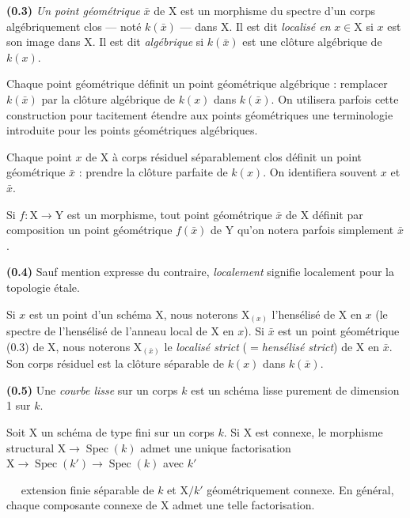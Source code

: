 \documentclass[11pt,leqno]{article}
\newcommand{\Page}[1]{\ifvmode\noindent\else\unskip\ \fi{\footnotesize\textcolor{gray}{[p.\,#1]}}\ \ignorespaces}
\begin{document}
\textbf{(0.3)} \textit{Un point géométrique} \(\bar{x}\) de \(\mathrm{X}\) est un morphisme du spectre d’un corps algébriquement clos — noté \(k(\bar{x})\) — dans \(\mathrm{X}\). Il est dit \textit{localisé en} \(x\in\mathrm{X}\) si \(x\) est son image dans \(\mathrm{X}\). Il est dit \textit{algébrique} si \(k(\bar{x})\) est une clôture algébrique de \(k(x)\).

Chaque point géométrique définit un point géométrique algébrique : remplacer \(k(\bar{x})\) par la clôture algébrique de \(k(x)\) dans \(k(\bar{x})\). On utilisera parfois cette construction pour tacitement étendre aux points géométriques une terminologie introduite pour les points géométriques algébriques.

Chaque point \(x\) de \(\mathrm{X}\) à corps résiduel séparablement clos définit un point géométrique \(\bar{x}\) : prendre la clôture parfaite de \(k(x)\). On identifiera souvent \(x\) et \(\bar{x}\).

Si \(f:\mathrm{X}\to\mathrm{Y}\) est un morphisme, tout point géométrique \(\bar{x}\) de \(\mathrm{X}\) définit par composition un point géométrique \(f(\bar{x})\) de \(\mathrm{Y}\) qu’on notera parfois simplement \(\bar{x}\).

\textbf{(0.4)} Sauf mention expresse du contraire, \textit{localement} signifie localement pour la topologie étale.

Si \(x\) est un point d’un schéma \(\mathrm{X}\), nous noterons \(\mathrm{X}_{(x)}\) l’hensélisé de \(\mathrm{X}\) en \(x\) (le spectre de l’hensélisé de l’anneau local de \(\mathrm{X}\) en \(x\)). Si \(\bar{x}\) est un point géométrique (0.3) de \(\mathrm{X}\), nous noterons \(\mathrm{X}_{(\bar{x})}\) le \textit{localisé strict} (\(=\)\textit{hensélisé strict}) de \(\mathrm{X}\) en \(\bar{x}\). Son corps résiduel est la clôture séparable de \(k(x)\) dans \(k(\bar{x})\).

\textbf{(0.5)} Une \textit{courbe lisse} sur un corps \(k\) est un schéma lisse purement de dimension 1 sur \(k\).

Soit \(\mathrm{X}\) un schéma de type fini sur un corps \(k\). Si \(\mathrm{X}\) est connexe, le morphisme structural \(\mathrm{X}\to\operatorname{Spec}(k)\) admet une unique factorisation \(\mathrm{X}\to\operatorname{Spec}(k')\to\operatorname{Spec}(k)\) avec \(k'\)

\Page{145}
extension finie séparable de \(k\) et \(\mathrm{X}/k'\) géométriquement connexe. En général, chaque composante connexe de \(\mathrm{X}\) admet une telle factorisation.
\end{document}
